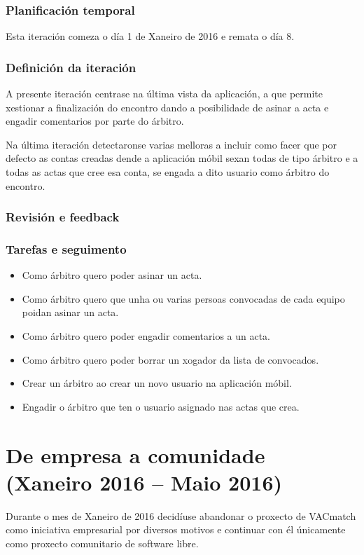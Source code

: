       \subsubsection{Planificación temporal}
      Esta iteración comeza o día 1 de Xaneiro de 2016 e remata o día 8.

      \subsubsection{Definición da iteración}
      A presente iteración centrase na última vista da aplicación, a que 
permite xestionar a finalización do encontro dando a posibilidade de asinar a 
acta e engadir comentarios por parte do árbitro.

      Na última iteración detectaronse varias melloras a incluir como facer que 
por defecto as contas creadas dende a aplicación móbil sexan todas de tipo 
árbitro e a todas as actas que cree esa conta, se engada a dito usuario como 
árbitro do encontro.

      \subsubsection{Revisión e feedback}
      

      \subsubsection{Tarefas e seguimento}

        \begin{itemize}
         \item Como árbitro quero poder asinar un acta.
         \item Como árbitro quero que unha ou varias persoas convocadas de cada 
equipo poidan asinar un acta.
         \item Como árbitro quero poder engadir comentarios a un acta.
         \item Como árbitro quero poder borrar un xogador da lista de 
convocados.
         \item Crear un árbitro ao crear un novo usuario na aplicación móbil.
         \item Engadir o árbitro que ten o usuario asignado nas actas que crea.
        \end{itemize}

  \section{De empresa a comunidade (Xaneiro 2016 -- Maio 2016)}
  Durante o mes de Xaneiro de 2016 decidíuse abandonar o proxecto de VACmatch 
como iniciativa empresarial por diversos motivos e continuar con él únicamente 
como proxecto comunitario de software libre.

